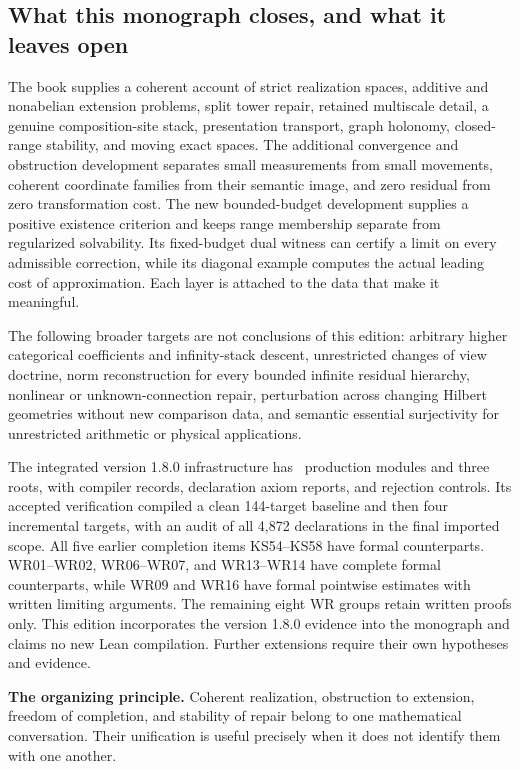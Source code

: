 \subsection{What this monograph closes, and what it leaves open}
The book supplies a coherent account of strict realization spaces, additive and nonabelian extension problems, split tower repair, retained multiscale detail, a genuine composition-site stack, presentation transport, graph holonomy, closed-range stability, and moving exact spaces. The additional convergence and obstruction development separates small measurements from small movements, coherent coordinate families from their semantic image, and zero residual from zero transformation cost. The new bounded-budget development supplies a positive existence criterion and keeps range membership separate from regularized solvability. Its fixed-budget dual witness can certify a limit on every admissible correction, while its diagonal example computes the actual leading cost of approximation. Each layer is attached to the data that make it meaningful.

The following broader targets are not conclusions of this edition: arbitrary higher categorical coefficients and infinity-stack descent, unrestricted changes of view doctrine, norm reconstruction for every bounded infinite residual hierarchy, nonlinear or unknown-connection repair, perturbation across changing Hilbert geometries without new comparison data, and semantic essential surjectivity for unrestricted arithmetic or physical applications.

The integrated version 1.8.0 infrastructure has \EditionCumulativeModules\ production modules and three roots, with compiler records, declaration axiom reports, and rejection controls. Its accepted verification compiled a clean 144-target baseline and then four incremental targets, with an audit of all 4,872 declarations in the final imported scope. All five earlier completion items KS54--KS58 have formal counterparts. WR01--WR02, WR06--WR07, and WR13--WR14 have complete formal counterparts, while WR09 and WR16 have formal pointwise estimates with written limiting arguments. The remaining eight WR groups retain written proofs only. This edition incorporates the version 1.8.0 evidence into the monograph and claims no new Lean compilation. Further extensions require their own hypotheses and evidence.

\begin{insight}
\textbf{The organizing principle.} Coherent realization, obstruction to extension, freedom of completion, and stability of repair belong to one mathematical conversation. Their unification is useful precisely when it does not identify them with one another.
\end{insight}
